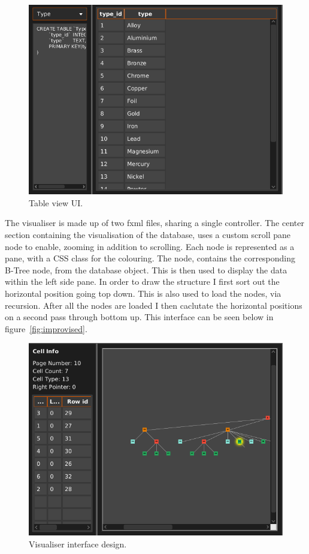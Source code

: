 \begin{figure}[H]
	\centering
	\includegraphics[scale=0.32]{images/ui_table_final.png}
	\caption{Table view UI.}
	\label{fig:imp_ui_table}
\end{figure}

The visualiser is made up of two fxml files, sharing a single controller. The center section containing the visualisation of the database, uses a custom scroll pane node to enable, zooming in addition to scrolling. Each node is represented as a pane, with a CSS class for the colouring. The node, contains the corresponding B-Tree node, from the database object. This is then used to display the data within the left side pane. In order to draw the structure I first sort out the horizontal position going top down. This is also used to load the nodes, via recursion. After all the nodes are loaded I then caclutate the horizontal positions on a second pass through bottom up. This interface can be seen below in figure~\ref{fig:improvised}.

\begin{figure}[H]
	\centering
	\includegraphics[scale=0.32]{images/ui_visuliser_final.png}
	\caption{Visualiser interface design.}
	\label{fig:imp_ui_vis}
\end{figure}

